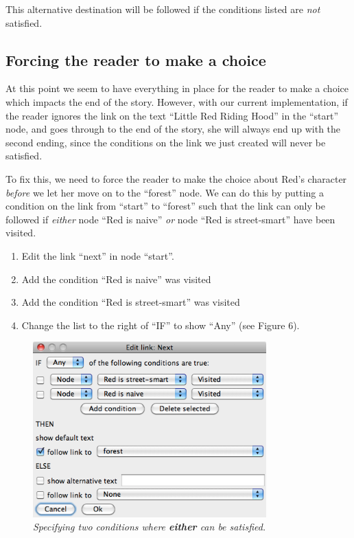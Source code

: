 \documentclass{article}
\begin{document}
This alternative destination will be followed if the conditions listed are
\textit{not} satisfied.

\subsection{Forcing the reader to make a choice}

At this point we seem to have everything in place for the reader to make a
choice which impacts the end of the story. However, with our current
implementation, if the reader ignores the link on the text ``Little Red Riding
Hood'' in the ``start'' node, and goes through to the end of the story, she will
always end up with the second ending, since the conditions on the link we just
created will never be satisfied.

To fix this, we need to force the reader to make the choice about Red's
character \textit{before} we let her move on to the ``forest'' node. We can do
this by putting a condition on the link from ``start'' to ``forest'' such that
the link can only be followed if \textit{either} node ``Red is naive''
\textit{or} node ``Red is street-smart'' have been visited.

\begin{enumerate}
  \item Edit the link ``next'' in node ``start''.
  \item Add the condition ``Red is naive'' was visited
  \item Add the condition ``Red is street-smart'' was visited
  \item Change the list to the right of ``IF'' to show ``Any'' (see Figure 6).
\end{enumerate}

\begin{figure}[h]
  \centering
  \includegraphics[width=9cm]{images/hypedyn-tutorial-2-figure-6}
  \caption{\textit{Specifying two conditions where \textbf{either} can be
  satisfied.}}
\end{figure} 
\end{document}
